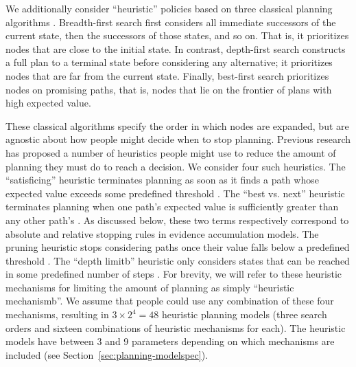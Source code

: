 We additionally consider ``heuristic'' policies based on three classical planning algorithms \citep{russell2002artificial}. Breadth-first search first considers all immediate successors of the current state, then the successors of those states, and so on. That is, it prioritizes nodes that are close to the initial state. In contrast, depth-first search constructs a full plan to a terminal state before considering any alternative; it prioritizes nodes that are far from the current state. Finally, best-first search prioritizes nodes on promising paths, that is, nodes that lie on the frontier of plans with high expected value.

These classical algorithms specify the order in which nodes are expanded, but are agnostic about how people might decide when to stop planning. Previous research has proposed a number of heuristics people might use to reduce the amount of planning they must do to reach a decision. We consider four such heuristics. The ``satisficing'' heuristic terminates planning as soon as it finds a path whose expected value exceeds some predefined threshold \citep{simon1955behavioral}. The ``best vs. next'' heuristic terminates planning when one path's expected value is sufficiently greater than any other path's \citep{solway2015evidence}. As discussed below, these two terms respectively correspond to absolute and relative stopping rules in evidence accumulation models. The pruning heuristic stops considering paths once their value falls below a predefined threshold \citep{huys2012bonsai}. The ``depth limitb'' heuristic only considers states that can be reached in some predefined number of steps \citep{macgregor2001information,keramati2016adaptive,krusche2018adaptive,snider2015prospective}. For brevity, we will refer to these heuristic mechanisms for limiting the amount of planning as simply ``heuristic mechanismb''. We assume that people could use any combination of these four mechanisms, resulting in $3 \times 2^4 = 48$ heuristic planning models (three search orders and sixteen combinations of heuristic mechanisms for each). The heuristic models have between 3 and 9 parameters depending on which mechanisms are included (see Section~\ref{sec:planning-modelspec}).

